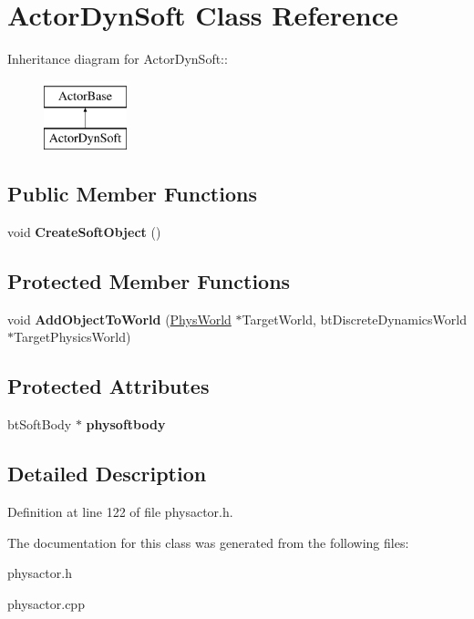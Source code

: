 \hypertarget{classActorDynSoft}{
\section{ActorDynSoft Class Reference}
\label{dc/de0/classActorDynSoft}
}
Inheritance diagram for ActorDynSoft::\begin{figure}[H]
\begin{center}
\leavevmode
\includegraphics[height=2cm]{dc/de0/classActorDynSoft}
\end{center}
\end{figure}
\subsection*{Public Member Functions}
\begin{DoxyCompactItemize}
\item 
\hypertarget{classActorDynSoft_a249bc0621b1d55ea0a9c7787605078d6}{
void {\bfseries CreateSoftObject} ()}
\label{dc/de0/classActorDynSoft_a249bc0621b1d55ea0a9c7787605078d6}

\end{DoxyCompactItemize}
\subsection*{Protected Member Functions}
\begin{DoxyCompactItemize}
\item 
\hypertarget{classActorDynSoft_a6bd52511d954edfe09c26594535dd2f1}{
void {\bfseries AddObjectToWorld} (\hyperlink{classPhysWorld}{PhysWorld} $\ast$TargetWorld, btDiscreteDynamicsWorld $\ast$TargetPhysicsWorld)}
\label{dc/de0/classActorDynSoft_a6bd52511d954edfe09c26594535dd2f1}

\end{DoxyCompactItemize}
\subsection*{Protected Attributes}
\begin{DoxyCompactItemize}
\item 
\hypertarget{classActorDynSoft_a9f5b3e1cfa400bb6095f77feb81e76d8}{
btSoftBody $\ast$ {\bfseries physoftbody}}
\label{dc/de0/classActorDynSoft_a9f5b3e1cfa400bb6095f77feb81e76d8}

\end{DoxyCompactItemize}


\subsection{Detailed Description}


Definition at line 122 of file physactor.h.

The documentation for this class was generated from the following files:\begin{DoxyCompactItemize}
\item 
physactor.h\item 
physactor.cpp\end{DoxyCompactItemize}
